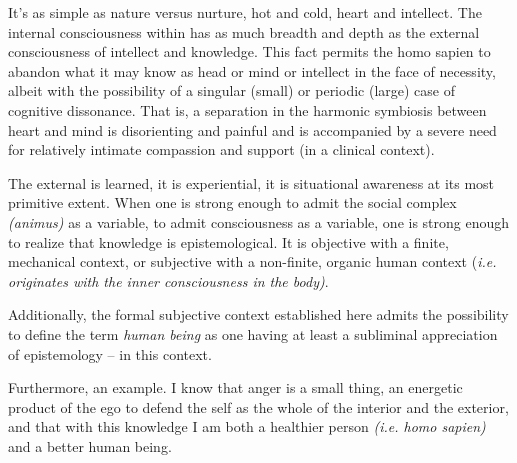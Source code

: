 

It's as simple as nature versus nurture, hot and cold, heart and
intellect.  The internal consciousness within has as much breadth and
depth as the external consciousness of intellect and knowledge.  This
fact permits the homo sapien to abandon what it may know as head or
mind or intellect in the face of necessity, albeit with the
possibility of a singular (small) or periodic (large) case of
cognitive dissonance.  That is, a separation in the harmonic symbiosis
between heart and mind is disorienting and painful and is accompanied
by a severe need for relatively intimate compassion and support (in a
clinical context).

The external is learned, it is experiential, it is situational
awareness at its most primitive extent.  When one is strong enough to
admit the social complex {\it (animus)} as a variable, to admit
consciousness as a variable, one is strong enough to realize that
knowledge is epistemological.  It is objective with a finite,
mechanical context, or subjective with a non-finite, organic human
context {(\it i.e. originates with the inner consciousness in the
body)}.

Additionally, the formal subjective context established here admits
the possibility to define the term {\it human being} as one having at
least a subliminal appreciation of epistemology -- in this context.

Furthermore, an example.  I know that anger is a small thing, an
energetic product of the ego to defend the self as the whole of the
interior and the exterior, and that with this knowledge I am both a
healthier person {\it (i.e. homo sapien)} and a better human being.

\bye
